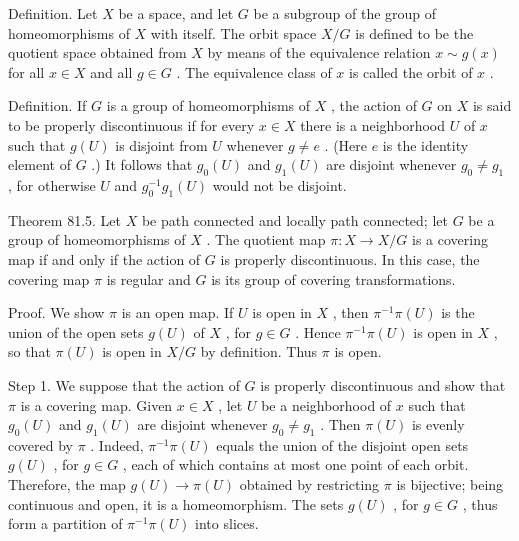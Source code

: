 \documentclass[10pt]{article}
\begin{document}
Definition. Let \(X\) be a space, and let \(G\) be a subgroup of the group of homeomorphisms of \(X\) with itself. The orbit space \(X/G\) is defined to be the quotient space obtained from \(X\) by means of the equivalence relation \(x \sim  g\left( x\right)\) for all \(x \in  X\) and all \(g \in  G\) . The equivalence class of \(x\) is called the orbit of \(x\) .

Definition. If \(G\) is a group of homeomorphisms of \(X\) , the action of \(G\) on \(X\) is said to be properly discontinuous if for every \(x \in  X\) there is a neighborhood \(U\) of \(x\) such that \(g\left( U\right)\) is disjoint from \(U\) whenever \(g \neq  e\) . (Here \(e\) is the identity element of \(G\) .) It follows that \({g}_{0}\left( U\right)\) and \({g}_{1}\left( U\right)\) are disjoint whenever \({g}_{0} \neq  {g}_{1}\) , for otherwise \(U\) and \({g}_{0}^{-1}{g}_{1}\left( U\right)\) would not be disjoint.

Theorem 81.5. Let \(X\) be path connected and locally path connected; let \(G\) be a group of homeomorphisms of \(X\) . The quotient map \(\pi  : X \rightarrow  X/G\) is a covering map if and only if the action of \(G\) is properly discontinuous. In this case, the covering map \(\pi\) is regular and \(G\) is its group of covering transformations.

Proof. We show \(\pi\) is an open map. If \(U\) is open in \(X\) , then \({\pi }^{-1}\pi \left( U\right)\) is the union of the open sets \(g\left( U\right)\) of \(X\) , for \(g \in  G\) . Hence \({\pi }^{-1}\pi \left( U\right)\) is open in \(X\) , so that \(\pi \left( U\right)\) is open in \(X/G\) by definition. Thus \(\pi\) is open.

Step 1. We suppose that the action of \(G\) is properly discontinuous and show that \(\pi\) is a covering map. Given \(x \in  X\) , let \(U\) be a neighborhood of \(x\) such that \({g}_{0}\left( U\right)\) and \({g}_{1}\left( U\right)\) are disjoint whenever \({g}_{0} \neq  {g}_{1}\) . Then \(\pi \left( U\right)\) is evenly covered by \(\pi\) . Indeed, \({\pi }^{-1}\pi \left( U\right)\) equals the union of the disjoint open sets \(g\left( U\right)\) , for \(g \in  G\) , each of which contains at most one point of each orbit. Therefore, the map \(g\left( U\right)  \rightarrow  \pi \left( U\right)\) obtained by restricting \(\pi\) is bijective; being continuous and open, it is a homeomorphism. The sets \(g\left( U\right)\) , for \(g \in  G\) , thus form a partition of \({\pi }^{-1}\pi \left( U\right)\) into slices.
\end{document}

